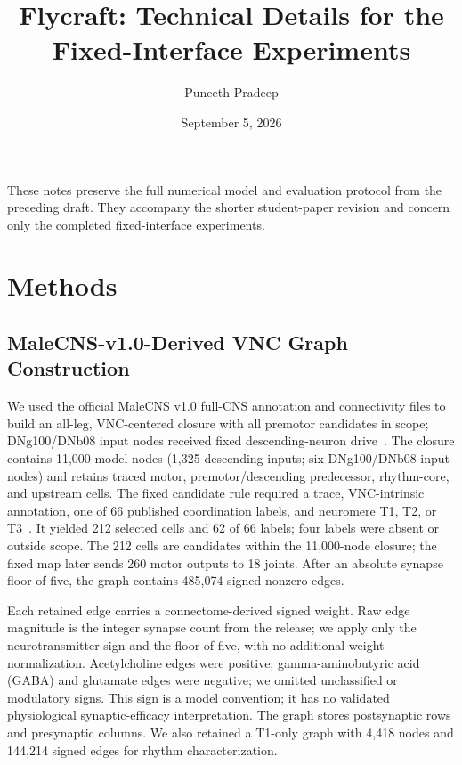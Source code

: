 \documentclass[10pt]{article}
\title{Flycraft: Technical Details for the Fixed-Interface Experiments}
\author{Puneeth Pradeep}
\date{September 5, 2026}
\begin{document}
\maketitle
These notes preserve the full numerical model and evaluation protocol from the preceding draft. They accompany the shorter student-paper revision and concern only the completed fixed-interface experiments.
\section{Methods}
\label{sec:methods}
\subsection{MaleCNS-v1.0-Derived VNC Graph Construction}
We used the official MaleCNS v1.0 full-CNS annotation and connectivity files to build an all-leg, VNC-centered closure with all premotor candidates in scope; DNg100/DNb08 input nodes received fixed descending-neuron drive~\cite{malecns,takemura2024manc}. The closure contains 11,000 model nodes (1,325 descending inputs; six DNg100/DNb08 input nodes) and retains traced motor, premotor/descending predecessor, rhythm-core, and upstream cells. The fixed candidate rule required a trace, VNC-intrinsic annotation, one of 66 published coordination labels, and neuromere T1, T2, or T3~\cite{cheong2026premotor}. It yielded 212 selected cells and 62 of 66 labels; four labels were absent or outside scope. The 212 cells are candidates within the 11,000-node closure; the fixed map later sends 260 motor outputs to 18 joints. After an absolute synapse floor of five, the graph contains 485,074 signed nonzero edges.

Each retained edge carries a connectome-derived signed weight. Raw edge magnitude is the integer synapse count from the release; we apply only the neurotransmitter sign and the floor of five, with no additional weight normalization. Acetylcholine edges were positive; gamma-aminobutyric acid (GABA) and glutamate edges were negative; we omitted unclassified or modulatory signs. This sign is a model convention; it has no validated physiological synaptic-efficacy interpretation. The graph stores postsynaptic rows and presynaptic columns. We also retained a T1-only graph with 4,418 nodes and 144,214 signed edges for rhythm characterization.
\end{document}
